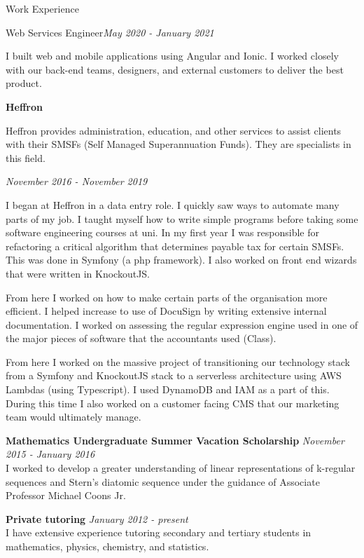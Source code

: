 \documentclass{resume} %
\begin{document}
\begin{rSection}{Work Experience}
\begin{adjustwidth}{2em}{}
        \begin{rSubsection}{Web Services Engineer}{\em May 2020 - January 2021}{}{}
            \item I built web and mobile applications using Angular and Ionic.
            I worked closely with our back-end teams, designers, and external customers
            to deliver the best product.
        \end{rSubsection}
    \end{adjustwidth}

    {\bf Heffron}

    Heffron provides administration, education, and other services to assist clients with their
    SMSFs (Self Managed Superannuation Funds). They are specialists in this field.

    \begin{adjustwidth}{2em}{}
        \begin{rSubsection}{}{\em November 2016 - November 2019}{}{}
            \item
            I began at Heffron in a data entry role. I quickly saw ways to automate many parts of my job.
            I taught myself how to write simple programs before taking some software engineering courses at uni.
            In my first year I was responsible for refactoring a critical algorithm that determines payable
            tax for certain SMSFs. This was done in Symfony (a php framework).
            I also worked on front end wizards that were written in KnockoutJS.

            From here I worked on how to make certain parts of the organisation more efficient. I helped increase
            to use of DocuSign by writing extensive internal documentation.
            I worked on assessing the regular expression engine used in one of the major pieces of software that
            the accountants used (Class).

            From here I worked on the massive project of transitioning our technology stack from a Symfony and KnockoutJS stack to a
            serverless architecture using AWS Lambdas (using Typescript). I used DynamoDB and IAM as a part of this. During this
            time I also worked on a customer facing CMS that our marketing team would ultimately manage.
        \end{rSubsection}
    \end{adjustwidth}

    {\bf Mathematics Undergraduate Summer Vacation Scholarship}
    \hfill {\em November 2015 - January 2016} \\
    I worked to develop a greater understanding of linear representations of k-regular
    sequences and Stern's diatomic sequence under the guidance of Associate Professor Michael Coons Jr.

    {\bf Private tutoring} \hfill {\em January 2012 - present} \\
    I have extensive experience tutoring secondary and tertiary students in mathematics,
    physics, chemistry, and statistics.
\end{rSection}
\end{document}

